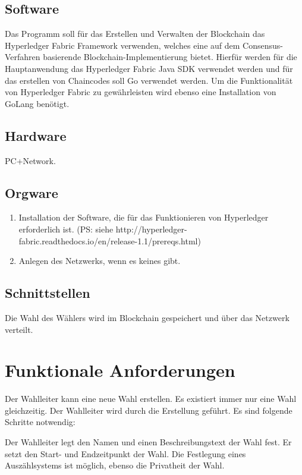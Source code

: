 \documentclass[parskip=full,11pt,twoside]{scrartcl}
\begin{document}
\subsection{Software}
Das Programm soll für das Erstellen und Verwalten der Blockchain das Hyperledger Fabric Framework verwenden, welches eine auf dem Consensus-Verfahren basierende Blockchain-Implementierung bietet.
Hierfür werden für die Hauptanwendung das Hyperledger Fabric Java SDK verwendet werden und für  das erstellen von Chaincodes soll Go verwendet werden.
Um die Funktionalität von Hyperledger Fabric zu gewährleisten wird ebenso eine Installation von GoLang benötigt.

\subsection{Hardware}
PC+Network.

\subsection{Orgware}
\begin{enumerate}
\item Installation der Software, die für das Funktionieren von Hyperledger erforderlich ist. (PS: siehe http://hyperledger-fabric.readthedocs.io/en/release-1.1/prereqs.html)
\item Anlegen des Netzwerks, wenn es keines gibt.
\end{enumerate}

\subsection{Schnittstellen}
Die Wahl des Wählers wird im Blockchain gespeichert und über das Netzwerk verteilt.

\section{Funktionale Anforderungen}

Der Wahlleiter kann eine neue Wahl erstellen. Es existiert immer nur eine Wahl gleichzeitig.
Der Wahlleiter wird durch die Erstellung geführt. Es sind folgende Schritte notwendig:

Der Wahlleiter legt den Namen und einen Beschreibungstext der Wahl fest.
Er setzt den Start- und Endzeitpunkt der Wahl.
Die Festlegung eines Auszählsystems ist möglich, ebenso die Privatheit der Wahl.
\end{document}
